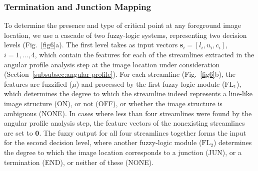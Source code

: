 \subsubsection{Termination and Junction Mapping}
\label{sec:cp-detection}
To determine the presence and type of critical point at any foreground image location, we use a cascade of two fuzzy-logic systems, representing two decision levels (Fig.~\ref{fig6}a). The first level takes as input vectors $\mathbf{s}_{i}=[l_{i},u_{i},c_{i}]$, $i=1,\dots,4$, which contain the features for each of the streamlines extracted in the angular profile analysis step at the image location under consideration (Section~\ref{subsubsec:angular-profile}). For each streamline (Fig.~\ref{fig6}b), the features are fuzzified ($\mu$) and processed by the first fuzzy-logic module ($\textrm{FL}_{1}$), which determines the degree to which the streamline indeed represents a line-like image structure (ON), or not (OFF), or whether the image structure is ambiguous (NONE). In cases where less than four streamlines were found by the angular profile analysis step, the feature vectors of the nonexisting streamlines are set to $\mathbf{0}$. The fuzzy output for all four streamlines together forms the input for the second decision level, where another fuzzy-logic module ($\textrm{FL}_{2}$) determines the degree to which the image location corresponds to a junction (JUN), or a termination (END), or neither of these (NONE).

